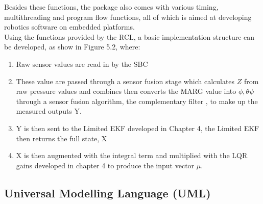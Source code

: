 \documentclass[12pt,a4paper,twoside]{report}
\begin{document}
				Besides these functions, the package also comes with various timing, multithreading and program flow functions, all of which is aimed at developing robotics software on embedded platforms.
				\\
				Using the functions provided by the RCL, a basic implementation structure can be developed, as show in Figure 5.2, where:
				\\
				\begin{enumerate}
					\item 
						Raw sensor values are read in by the SBC
					\item 
						These value are passed through a sensor fusion stage which calculates $Z$ from raw pressure values and combines then converts the MARG value into $\phi,\theta\psi$ through a sensor fusion algorithm, the complementary filter \cite{20}, to make up the measured outputs Y.
					\item 
						Y is then sent to the Limited EKF developed in Chapter 4, the Limited EKF then returns the full state, X
					\item 
						X is then augmented with the integral term and multiplied with the LQR gains developed in chapter 4 to produce the input vector $\mu$.
				\end{enumerate}
			
			\subsection{Universal Modelling Language (UML)}
			
\end{document}
